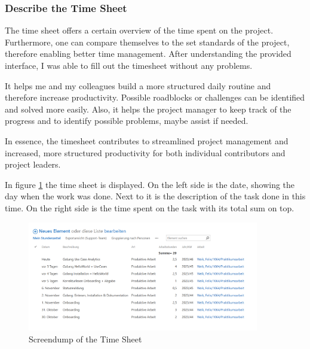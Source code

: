 \subsubsection*{Describe the Time Sheet}
The time sheet offers a certain overview of the time spent on the project. 
Furthermore, one can compare themselves to the set standards of the project, therefore enabling better time management.
After understanding the provided interface, I was able to fill out the timesheet without any problems.

It helps me and my colleagues build a more structured daily routine and therefore increase productivity. Possible roadblocks or challenges can be identified and solved more easily.
Also, it helps the project manager to keep track of the progress and to identify possible problems, maybe assist if needed.

In essence, the timesheet contributes to streamlined project management and increased, more structured productivity for both individual contributors and project leaders.

In figure \ref{fig:time_sheet} the time sheet is displayed.
On the left side is the date, showing the day when the work was done.
Next to it is the description of the task done in this time.
On the right side is the time spent on the task with its total sum on top.

\begin{figure}[h]
    \centering
    \includegraphics[width=0.9\textwidth]{figures/onboarding/stundenzettel_screendump.png}
    \caption{Screendump of the Time Sheet}
    \label{fig:time_sheet}
\end{figure}

